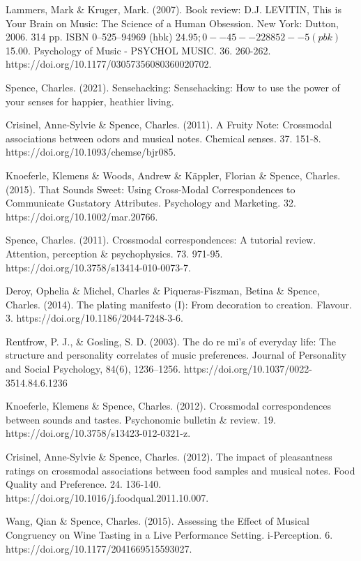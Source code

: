 \documentclass[conference]{IEEEtran}
\begin{document}
\begin{thebibliography}{00}
 Lammers, Mark \& Kruger, Mark. (2007). Book review: D.J. LEVITIN, This is Your Brain on Music: The Science of a Human Obsession. New York: Dutton, 2006. 314 pp. ISBN 0--525--94969 (hbk) $24.95; 0--45--228852--5 (pbk) $15.00. Psychology of Music - PSYCHOL MUSIC. 36. 260-262. https://doi.org/10.1177/03057356080360020702.

 Spence, Charles. (2021). Sensehacking: Sensehacking: How to use the power of your senses for happier, heathier living.

 Crisinel, Anne-Sylvie \& Spence, Charles. (2011). A Fruity Note: Crossmodal associations between odors and musical notes. Chemical senses. 37. 151-8. https://doi.org/10.1093/chemse/bjr085.

 Knoeferle, Klemens \& Woods, Andrew \& Käppler, Florian \& Spence, Charles. (2015). That Sounds Sweet: Using Cross-Modal Correspondences to Communicate Gustatory Attributes. Psychology and Marketing. 32. https://doi.org/10.1002/mar.20766. 

 Spence, Charles. (2011). Crossmodal correspondences: A tutorial review. Attention, perception \& psychophysics. 73. 971-95. https://doi.org/10.3758/s13414-010-0073-7. 

 Deroy, Ophelia \& Michel, Charles \& Piqueras-Fiszman, Betina \& Spence, Charles. (2014). The plating manifesto (I): From decoration to creation. Flavour. 3. https://doi.org/10.1186/2044-7248-3-6. 

 Rentfrow, P. J., \& Gosling, S. D. (2003). The do re mi's of everyday life: The structure and personality correlates of music preferences. Journal of Personality and Social Psychology, 84(6), 1236–1256. https://doi.org/10.1037/0022-3514.84.6.1236

 Knoeferle, Klemens \& Spence, Charles. (2012). Crossmodal correspondences between sounds and tastes. Psychonomic bulletin \& review. 19. https://doi.org/10.3758/s13423-012-0321-z. 

 Crisinel, Anne-Sylvie \& Spence, Charles. (2012). The impact of pleasantness ratings on crossmodal associations between food samples and musical notes. Food Quality and Preference. 24. 136-140. https://doi.org/10.1016/j.foodqual.2011.10.007.

 Wang, Qian \& Spence, Charles. (2015). Assessing the Effect of Musical Congruency on Wine Tasting in a Live Performance Setting. i-Perception. 6. https://doi.org/10.1177/2041669515593027.

\end{thebibliography}
\end{document}
